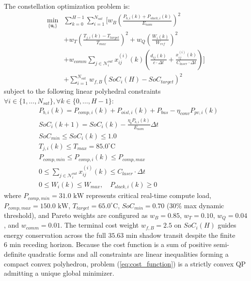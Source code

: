 \documentclass[journal]{IEEEtran}
\begin{document}
The constellation optimization problem is:
\begin{equation}
\begin{split}
    \min_{\{\mathbf{u}_i\}} & \sum_{k=0}^{H-1} \sum_{i=1}^{N_{sat}} \Bigg[ w_B \left( \frac{P_{b,i}(k) + P_{slack,i}(k)}{E_{nom}} \right)^2 \\
    & + w_T \left(\frac{T_{j,i}(k) - T_{target}}{T_{max}}\right)^2 + w_Q \left(\frac{W_i(k)}{W_{ref}}\right)^2 \\
    & + w_{comm} \sum_{j \in \mathcal{N}_i^{out}} x_{ij}^{(i)}(k) \left( \frac{d_{ij}(k)}{c \cdot \Delta t} + \frac{x_{ij}^{(i)}(k)}{C_{laser} \cdot \Delta t} \right) \Bigg] \\
    & + \sum_{i=1}^{N_{sat}} w_{f,B} \left( SoC_i(H) - SoC_{target} \right)^2
\end{split}
\label{eq:cost_function}
\end{equation}
subject to the following linear polyhedral constraints $\forall i \in \{1, \dots, N_{sat}\}, \forall k \in \{0, \dots, H-1\}$:
\begin{align}
    & P_{b,i}(k) = P_{comp,i}(k) + P_{oisl,i}(k) + P_{bus} - \eta_{conv} P_{pv,i}(k) \label{eq:c_power} \\
    & SoC_i(k+1) = SoC_i(k) - \frac{\eta_b P_{b,i}(k)}{E_{nom}}\Delta t \label{eq:c_soc_dyn} \\
    & SoC_{min} \le SoC_i(k) \le 1.0 \label{eq:c_soc} \\
    & T_{j,i}(k) \le T_{max} = 85.0^\circ\text{C} \label{eq:c_temp} \\
    & P_{comp,min} \le P_{comp,i}(k) \le P_{comp,max} \label{eq:c_pcomp} \\
    & 0 \le \sum_{j \in \mathcal{N}_i^{out}} x_{ij}^{(i)}(k) \le C_{laser} \cdot \Delta t \label{eq:c_oisl} \\
    & 0 \le W_i(k) \le W_{max}, \quad P_{slack,i}(k) \ge 0 \label{eq:c_pos}
\end{align}
where $P_{comp,min} = 31.0\text{ kW}$ represents critical real-time compute load, $P_{comp,max} = 150.0\text{ kW}$, $T_{target} = 65.0^\circ\text{C}$, $SoC_{min} = 0.70$ ($30\%$ max dynamic threshold), and Pareto weights are configured as $w_B = 0.85$, $w_T = 0.10$, $w_Q = 0.04$, and $w_{comm} = 0.01$. The terminal cost weight $w_{f,B} = 2.5$ on $SoC_i(H)$ guides energy conservation across the full $35.63\text{ min}$ shadow transit despite the finite $6\text{ min}$ receding horizon. Because the cost function is a sum of positive semi-definite quadratic forms and all constraints are linear inequalities forming a compact convex polyhedron, problem (\ref{eq:cost_function}) is a strictly convex QP admitting a unique global minimizer.
\end{document}
